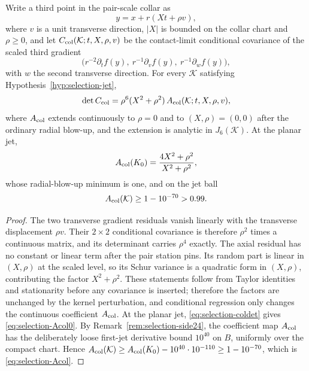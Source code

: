\begin{lemma}\label{lem:selection-collarfactor}
Write a third point in the pair-scale collar as
\begin{equation}\label{eq:selection-collarpt2}
y=x+r(Xt+\rho v),
\end{equation}
where $v$ is a unit transverse direction, $|X|$ is bounded on the collar chart and $\rho\ge0$, and let $C_{\rm col}(\mathcal K;t,X,\rho,v)$ be the contact-limit conditional covariance of the scaled third gradient
\begin{equation}\label{eq:selection-colgrad}
\bigl(r^{-2}\partial_tf(y),\ r^{-1}\partial_vf(y),\ r^{-1}\partial_wf(y)\bigr),
\end{equation}
with $w$ the second transverse direction. For every $\mathcal K$ satisfying Hypothesis~\ref{hyp:selection-jet},
\begin{equation}\label{eq:selection-colfactor}
\det C_{\rm col}=\rho^6(X^2+\rho^2)\,A_{\rm col}(\mathcal K;t,X,\rho,v),
\end{equation}
where $A_{\rm col}$ extends continuously to $\rho=0$ and to $(X,\rho)=(0,0)$ after the ordinary radial blow-up, and the extension is analytic in $J_6(\mathcal K)$. At the planar jet,
\begin{equation}\label{eq:selection-Acol0}
A_{\rm col}(K_0)=\frac{4X^2+\rho^2}{X^2+\rho^2},
\end{equation}
whose radial-blow-up minimum is one, and on the jet ball
\begin{equation}\label{eq:selection-Acol}
A_{\rm col}(\mathcal K)\ge1-10^{-70}>0.99 .
\end{equation}
\end{lemma}

\begin{proof}
The two transverse gradient residuals vanish linearly with the transverse displacement $\rho v$. Their $2\times2$ conditional covariance is therefore $\rho^2$ times a continuous matrix, and its determinant carries $\rho^4$ exactly. The axial residual has no constant or linear term after the pair station pins. Its random part is linear in $(X,\rho)$ at the scaled level, so its Schur variance is a quadratic form in $(X,\rho)$, contributing the factor $X^2+\rho^2$. These statements follow from Taylor identities and stationarity before any covariance is inserted; therefore the factors are unchanged by the kernel perturbation, and conditional regression only changes the continuous coefficient $A_{\rm col}$. At the planar jet, \eqref{eq:selection-coldet} gives \eqref{eq:selection-Acol0}. By Remark~\ref{rem:selection-side24}, the coefficient map $A_{\rm col}$ has the deliberately loose first-jet derivative bound $10^{40}$ on $B$, uniformly over the compact chart. Hence $A_{\rm col}(\mathcal K)\ge A_{\rm col}(K_0)-10^{40}\cdot10^{-110}\ge1-10^{-70}$, which is \eqref{eq:selection-Acol}.
\end{proof}

